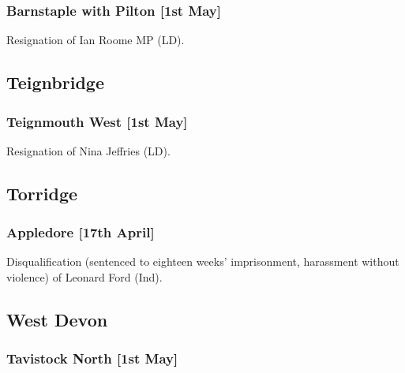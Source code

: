 \documentclass[a4paper,openany]{book}
\begin{document}
\begin{resultsiii}
\subsubsection*{Barnstaple with Pilton \hspace*{\fill}\nolinebreak[1]%
	\enspace\hspace*{\fill}
	[1st May]}


Resignation of Ian Roome MP (LD).

\subsection*{Teignbridge}

\subsubsection*{Teignmouth West \hspace*{\fill}\nolinebreak[1]%
	\enspace\hspace*{\fill}
	[1st May]}


Resignation of Nina Jeffries (LD).

\subsection*{Torridge}

\subsubsection*{Appledore \hspace*{\fill}\nolinebreak[1]%
	\enspace\hspace*{\fill}
	[17th April]}


Disqualification (sentenced to eighteen weeks' imprisonment, harassment without violence) of Leonard Ford (Ind).

\subsection*{West Devon}

\subsubsection*{Tavistock North \hspace*{\fill}\nolinebreak[1]%
	\enspace\hspace*{\fill}
	[1st May]}


\end{resultsiii}
\end{document}
